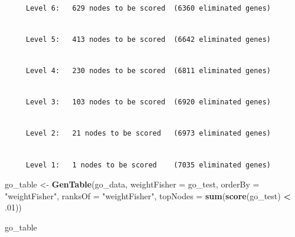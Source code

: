 \documentclass[]{article}
\newenvironment{Shaded}{\begin{snugshade}}{\end{snugshade}}
\newcommand{\KeywordTok}[1]{\textcolor[rgb]{0.13,0.29,0.53}{\textbf{#1}}}
\newcommand{\DataTypeTok}[1]{\textcolor[rgb]{0.13,0.29,0.53}{#1}}
\newcommand{\DecValTok}[1]{\textcolor[rgb]{0.00,0.00,0.81}{#1}}
\newcommand{\StringTok}[1]{\textcolor[rgb]{0.31,0.60,0.02}{#1}}
\newcommand{\OperatorTok}[1]{\textcolor[rgb]{0.81,0.36,0.00}{\textbf{#1}}}
\newcommand{\NormalTok}[1]{#1}
\begin{document}
\begin{verbatim}

     Level 6:   629 nodes to be scored  (6360 eliminated genes)
\end{verbatim}

\begin{verbatim}

     Level 5:   413 nodes to be scored  (6642 eliminated genes)
\end{verbatim}

\begin{verbatim}

     Level 4:   230 nodes to be scored  (6811 eliminated genes)
\end{verbatim}

\begin{verbatim}

     Level 3:   103 nodes to be scored  (6920 eliminated genes)
\end{verbatim}

\begin{verbatim}

     Level 2:   21 nodes to be scored   (6973 eliminated genes)
\end{verbatim}

\begin{verbatim}

     Level 1:   1 nodes to be scored    (7035 eliminated genes)
\end{verbatim}

\begin{Shaded}
\begin{Highlighting}[]
\NormalTok{go_table <-}\StringTok{ }\KeywordTok{GenTable}\NormalTok{(go_data, }\DataTypeTok{weightFisher =}\NormalTok{ go_test,}
                         \DataTypeTok{orderBy =} \StringTok{"weightFisher"}\NormalTok{, }\DataTypeTok{ranksOf =} \StringTok{"weightFisher"}\NormalTok{,}
                         \DataTypeTok{topNodes =} \KeywordTok{sum}\NormalTok{(}\KeywordTok{score}\NormalTok{(go_test) }\OperatorTok{<}\StringTok{ }\NormalTok{.}\DecValTok{01}\NormalTok{))}

\NormalTok{go_table}
\end{Highlighting}
\end{Shaded}
\end{document}
